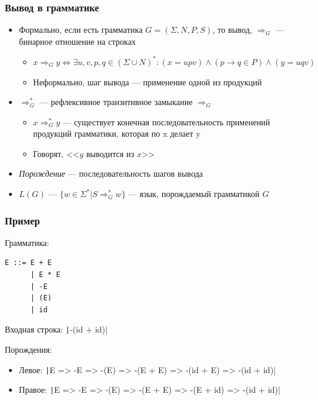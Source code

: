 \documentclass{../../slides-style}
\begin{document}
    \begin{frame}
        \frametitle{Вывод в грамматике}
        \begin{itemize}
            \item Формально, если есть грамматика $G = (\Sigma, N, P, S)$, то вывод, $\Rightarrow_G$ --- бинарное отношение на строках
            \begin{itemize}
                \item $x \Rightarrow_G y \iff \exists u, v, p, q \in (\Sigma \cup N)^*: (x = upv) \wedge (p \rightarrow q \in P) \wedge (y = uqv)$
                \item Неформально, шаг вывода --- применение одной из продукций
            \end{itemize}
            \item $\Rightarrow_G^*$ --- рефлексивное транзитивное замыкание $\Rightarrow_G$
            \begin{itemize}
                \item $x \Rightarrow_G^* y$ --- существует конечная последовательность применений продукций грамматики, которая по x делает y
                \item Говорят, <<$y$ выводится из $x$>>
            \end{itemize}
            \item \textit{Порождение} --- последовательность шагов вывода
            \item $L(G)$ --- $\{w \in \Sigma^* | S \Rightarrow_G^* w\}$ --- язык, порождаемый грамматикой $G$
        \end{itemize}
    \end{frame}

    \begin{frame}[fragile]
        \frametitle{Пример}
        Грамматика:
        \begin{verbatim}
E ::= E + E
      | E * E
      | -E
      | (E)
      | id
        \end{verbatim}
        
        Входная строка: \texttt|-(id + id)|
        
        Порождения:
        \begin{itemize}
            \item Левое: \texttt|E => -E => -(E) => -(E + E) => -(id + E) => -(id + id)|
            \item Правое: \texttt|E => -E => -(E) => -(E + E) => -(E + id) => -(id + id)|
        \end{itemize}
    \end{frame}
\end{document}

